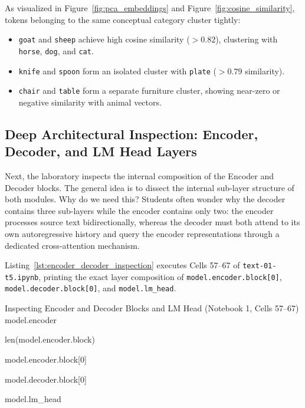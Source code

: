 \documentclass[11pt,a4paper]{article}
\begin{document}
As visualized in Figure~\ref{fig:pca_embeddings} and Figure~\ref{fig:cosine_similarity}, tokens belonging to the same conceptual category cluster tightly:
\begin{itemize}
    \item \texttt{goat} and \texttt{sheep} achieve high cosine similarity ($> 0.82$), clustering with \texttt{horse}, \texttt{dog}, and \texttt{cat}.
    \item \texttt{knife} and \texttt{spoon} form an isolated cluster with \texttt{plate} ($> 0.79$ similarity).
    \item \texttt{chair} and \texttt{table} form a separate furniture cluster, showing near-zero or negative similarity with animal vectors.
\end{itemize}

\subsection{Deep Architectural Inspection: Encoder, Decoder, and LM Head Layers}

Next, the laboratory inspects the internal composition of the Encoder and Decoder blocks. The general idea is to dissect the internal sub-layer structure of both modules. Why do we need this? Students often wonder why the decoder contains three sub-layers while the encoder contains only two: the encoder processes source text bidirectionally, whereas the decoder must both attend to its own autoregressive history and query the encoder representations through a dedicated cross-attention mechanism.

Listing~\ref{lst:encoder_decoder_inspection} executes Cells 57--67 of \texttt{text-01-t5.ipynb}, printing the exact layer composition of \texttt{model.encoder.block[0]}, \texttt{model.decoder.block[0]}, and \texttt{model.lm\_head}.

\begin{solutioncode}[label=lst:encoder_decoder_inspection]{Inspecting Encoder and Decoder Blocks and LM Head (Notebook 1, Cells 57--67)}
model.encoder

len(model.encoder.block)

model.encoder.block[0]

model.decoder.block[0]

model.lm_head
\end{solutioncode}
\end{document}
